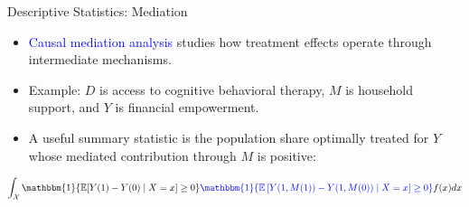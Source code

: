\documentclass[aspectratio=169,xcolor=dvipsnames]{beamer}
\begin{document}
\begin{frame}{Descriptive Statistics: Mediation}
\centering
{}

\begin{itemize}
    \item \textcolor{blue}{Causal mediation analysis} \citep*{ImaiKeeleTingley2010} studies how treatment effects operate through intermediate mechanisms.

    \item Example: $D$ is access to cognitive behavioral therapy, $M$ is household support, and $Y$ is financial empowerment.

    \item A useful summary statistic is the population share optimally treated for $Y$ whose mediated contribution through $M$ is positive:
\end{itemize}

    \[
    \int_\mathcal{X} \mathbbm{1}\{\mathbb{E}[Y(1) - Y(0) \mid X=x] \geq 0\}\textcolor{blue}{\mathbbm{1}\{\mathbb{E}\left[Y(1,M(1))-Y(1,M(0))\mid X=x\right]\geq 0\}}f(x)dx
    \]
\end{frame}
\end{document}
